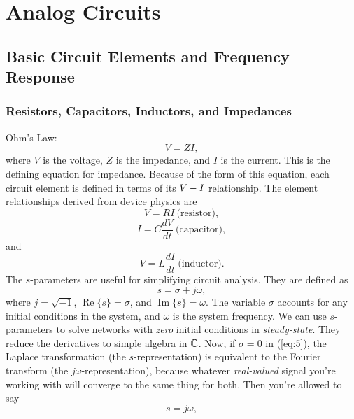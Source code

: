 \documentclass[12pt]{report}
\renewcommand\Re{\operatorname{Re}}
\renewcommand\Im{\operatorname{Im}}
\begin{document}

\newpage
\tableofcontents
\newpage
\chapter{Analog Circuits} \hr
\section{Basic Circuit Elements and Frequency Response}
\subsection{Resistors, Capacitors, Inductors, and Impedances}
Ohm's Law:
\begin{equation}
\label{eq:1}
V = Z I,
\end{equation}
where $V$ is the voltage, $Z$ is the impedance, and $I$ is the current. This is the defining equation for impedance.
Because of the form of this equation, each circuit element is defined in terms of its $V \-- I$ relationship. The element relationships derived from device physics are
\begin{equation}
\label{eq:2}
V = R I ~\text{(resistor)},
\end{equation}
\begin{equation}
\label{eq:3}
I = C \frac{dV}{dt} ~\text{(capacitor)},
\end{equation}
and
\begin{equation}
\label{eq:4}
V = L \frac{dI}{dt} ~\text{(inductor)}.
\end{equation}
The $s$-parameters are useful for simplifying circuit analysis. They are defined as
\begin{equation}
\label{eq:5}
s = \sigma + j \omega,
\end{equation}
where $j = \sqrt{-1}$, $\Re\{ s \} = \sigma$, and $\Im\{ s \} = \omega$. The variable $\sigma$ accounts for any initial conditions in the system, and $\omega$ is the system frequency. We can use $s$-parameters to solve networks with \textit{zero} initial conditions in \textit{steady-state}. They reduce the derivatives to simple algebra in $\mathbb{C}$. Now, if $\sigma = 0$ in (\ref{eq:5}), the Laplace transformation (the $s$-representation) is equivalent to the Fourier transform (the $j \omega$-representation), because whatever \textit{real-valued} signal you're working with will converge to the same thing for both. Then you're allowed to say
\begin{equation}
\label{eq:6}
s = j \omega,
\end{equation}
\end{document}
